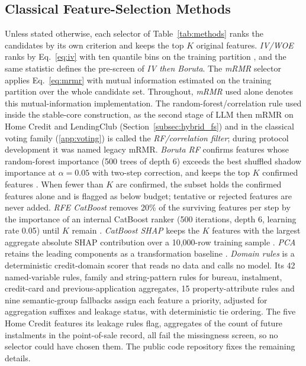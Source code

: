 \documentclass[final,5p,twocolumn]{elsarticle}
\newcommand{\Kfeat}{K}
\begin{document}
\subsection{Classical Feature-Selection Methods}
\label{subsec:classical_fs}

Unless stated otherwise, each selector of Table~\ref{tab:methods} ranks the candidates by its own criterion and keeps the top $\Kfeat$ original features. \emph{IV/WOE} ranks by Eq.~\eqref{eq:iv} with ten quantile bins on the training partition \cite{siddiqi2006}, and the same statistic defines the pre-screen of \emph{IV then Boruta}. The \emph{mRMR} selector applies Eq.~\eqref{eq:mrmr} with mutual information estimated on the training partition \cite{peng2005,kraskov2004,ross2014} over the whole candidate set. Throughout, \emph{mRMR} used alone denotes this mutual-information implementation. The random-forest/correlation rule used inside the stable-core construction, as the second stage of LLM then mRMR on Home Credit and LendingClub (Section~\ref{subsec:hybrid_fs}) and in the classical voting family (\ref{app:voting}) is called the \emph{RF/correlation filter}; during protocol development it was named legacy mRMR. \emph{Boruta RF} confirms features whose random-forest importance (500 trees of depth 6) exceeds the best shuffled shadow importance at $\alpha=0.05$ with two-step correction, and keeps the top $\Kfeat$ confirmed features \cite{kursa2010,breiman2001}. When fewer than $\Kfeat$ are confirmed, the subset holds the confirmed features alone and is flagged as below budget; tentative or rejected features are never added. \emph{RFE CatBoost} removes 20\% of the surviving features per step by the importance of an internal CatBoost ranker (500 iterations, depth 6, learning rate 0.05) until $\Kfeat$ remain \cite{guyon2002}. \emph{CatBoost SHAP} keeps the $\Kfeat$ features with the largest aggregate absolute SHAP contribution over a 10,000-row training sample \cite{lundberg2017}. \emph{PCA} retains the leading components as a transformation baseline \cite{jolliffe2016}. \emph{Domain rules} is a deterministic credit-domain scorer that reads no data and calls no model. Its 42 named-variable rules, family and string-pattern rules for bureau, instalment, credit-card and previous-application aggregates, 15 property-attribute rules and nine semantic-group fallbacks assign each feature a priority, adjusted for aggregation suffixes and leakage status, with deterministic tie ordering. The five Home Credit features its leakage rules flag, aggregates of the count of future instalments in the point-of-sale record, all fail the missingness screen, so no selector could have chosen them. The public code repository fixes the remaining details.
\end{document}

